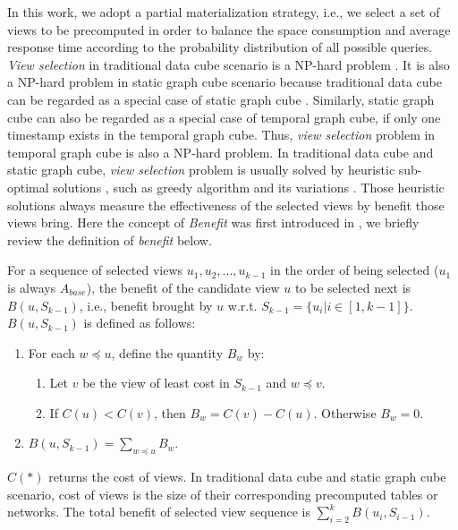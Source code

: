 \documentclass[10pt,journal,compsoc]{IEEEtran}
\begin{document}

In this work, we adopt a partial materialization strategy, i.e., we select a set of views to be precomputed in order to balance the space consumption and average response time according to the probability distribution of all possible queries. \textit{View selection} in traditional data cube scenario is a NP-hard problem \cite{karloff1999complexity}. It is also a NP-hard problem in static graph cube scenario because traditional data cube can be regarded as a special case of static graph cube \cite{zhao2011graph}. Similarly, static graph cube can also be regarded as a special case of temporal graph cube, if only one timestamp exists in the temporal graph cube. Thus, \textit{view selection} problem in temporal graph cube is also a NP-hard problem. In traditional data cube and static graph cube, \textit{view selection} problem is usually solved by heuristic sub-optimal solutions \cite{karloff1999complexity,zhao2011graph}, such as greedy algorithm and its variations \cite{morfonios2007rolap}. Those heuristic solutions always measure the effectiveness of the selected views by benefit those views bring. Here the concept of \textit{Benefit} was first introduced in \cite{harinarayan1996implementing}, we briefly review the definition of \textit{benefit} below.
\begin{definition}
	\label{def:benefit_views}
	For a sequence of selected views $ u_1,u_2,...,u_{k-1} $ in the order of being selected ($ u_1 $ is always $ A_{base} $), the benefit of the candidate view $ u $ to be selected next is $ B(u,S_{k-1}) $, i.e., benefit brought by $ u $ w.r.t. $ S_{k-1}=\{u_i|i \in [1,k-1]\}$. $ B(u,S_{k-1}) $ is defined as follows:
	\begin{enumerate}
		\item For each $ w \preceq u $, define the quantity $ B_w $ by:
		\begin{enumerate}[label={(\alph*)}]
			\item Let $ v $ be the view of least cost in $ S_{k-1} $ and $ w \preceq v $.
			\item If $ C(u)<C(v) $, then $ B_w=C(v)-C(u) $. Otherwise $ B_w=0 $.
		\end{enumerate}
		\item $ B(u,S_{k-1})=\sum_{w \preceq u}B_w $.
	\end{enumerate}
	$ C(\ast) $ returns the cost of views. In traditional data cube and static graph cube scenario, cost of views is the size of their corresponding precomputed tables or networks. The total benefit of selected view sequence is $ \sum_{i=2}^{k}B(u_i,S_{i-1}) $.
\end{definition}
\end{document}
